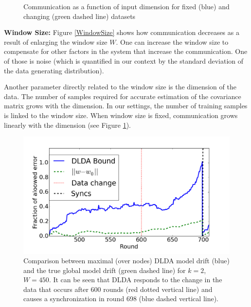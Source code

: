 \documentclass{vldb}
\begin{document}
\begin{figure}[!htb]
  \caption{Communication as a function of input dimension for fixed (blue) and
  changing (green  dashed line) datasets}\label{Dimension}
\endminipage
\end{figure}

\noindent\textbf{Window Size:}
Figure \ref{WindowSize} shows how communication decreases as a result
of enlarging the window size $W$.  One can increase the window size to compensate for other factors in the system that increase the communication. One of those is
noise (which is quantified in our context by the standard deviation of the
data generating distribution).


Another parameter directly related to the window size is the dimension of the data. The number of samples required for accurate estimation of the covariance matrix grows with the dimension. In our settings, the number of training samples is linked to the window size. When window size is fixed, communication grows linearly with the dimension (see Figure \ref{Dimension}).



\begin{figure}
	\centering
	\includegraphics[width=\textwidth]{Usenet/DriftDetected.png}
	\caption{Comparison between maximal (over nodes) DLDA model drift (blue)
	and the true global model drift (green dashed line) for $k=2$, $W=450$.
	It can be seen that DLDA responds to the change in the data that occurs
	after 600 rounds (red dotted vertical line) and causes a synchronization in round 698 (blue dashed vertical line).}
	\label{usenet}
	\end{figure}
\end{document}
